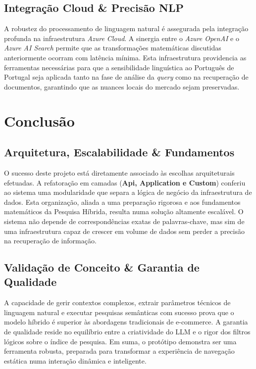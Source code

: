 \documentclass[runningheads]{llncs}
\begin{document}
\subsection*{Integração Cloud \& Precisão NLP}
A robustez do processamento de linguagem natural é assegurada pela integração profunda na infraestrutura \textit{Azure Cloud}. A sinergia entre o \textit{Azure OpenAI} e o \textit{Azure AI Search} permite que as transformações matemáticas discutidas anteriormente ocorram com latência mínima. Esta infraestrutura providencia as ferramentas necessárias para que a sensibilidade linguística ao Português de Portugal seja aplicada tanto na fase de análise da \textit{query} como na recuperação de documentos, garantindo que as nuances locais do mercado sejam preservadas.

\section*{Conclusão}
\subsection*{Arquitetura, Escalabilidade \& Fundamentos}
O sucesso deste projeto está diretamente associado às escolhas arquiteturais efetuadas. A refatoração em camadas (\textbf{Api, Application e Custom}) conferiu ao sistema uma modularidade que separa a lógica de negócio da infraestrutura de dados. Esta organização, aliada a uma preparação rigorosa e aos fundamentos matemáticos da Pesquisa Híbrida, resulta numa solução altamente escalável. O sistema não depende de correspondências exatas de palavras-chave, mas sim de uma infraestrutura capaz de crescer em volume de dados sem perder a precisão na recuperação de informação.

\subsection*{Validação de Conceito \& Garantia de Qualidade}
A capacidade de gerir contextos complexos, extrair parâmetros técnicos de linguagem natural e executar pesquisas semânticas com sucesso prova que o modelo híbrido é superior às abordagens tradicionais de e-commerce. A garantia de qualidade reside no equilíbrio entre a criatividade do LLM e o rigor dos filtros lógicos sobre o índice de pesquisa. Em suma, o protótipo demonstra ser uma ferramenta robusta, preparada para transformar a experiência de navegação estática numa interação dinâmica e inteligente.
\end{document}
